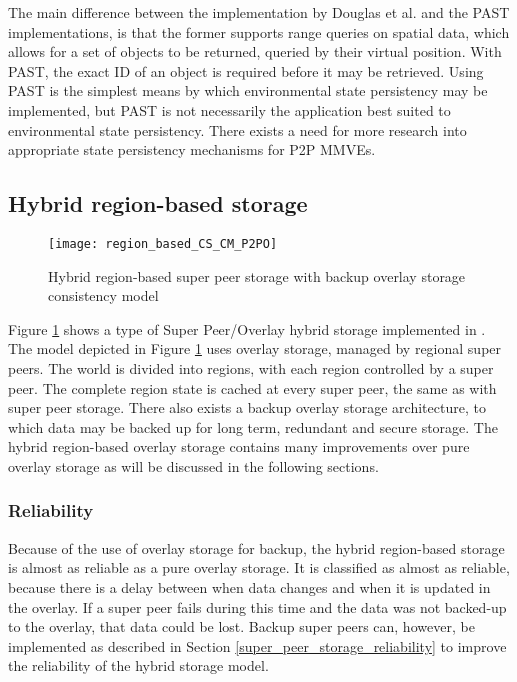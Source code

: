 The main difference between the implementation by Douglas et al. and the PAST implementations, is that the former supports range queries on spatial data, which allows for a set of objects to be returned, queried by their virtual position. With PAST, the exact ID of an object is required before it may be retrieved. Using PAST is the simplest means by which environmental state persistency may be implemented, but PAST is not necessarily the application best suited to environmental state persistency. There exists a need for more research into appropriate state persistency mechanisms for P2P MMVEs.

\subsection{Hybrid region-based storage}
\label{hybrid_storage}

\begin{figure}[htbp]
 \centering
 \texttt{[image: region\_based\_CS\_CM\_P2PO]}
 \caption{Hybrid region-based super peer storage with backup overlay storage consistency model}
 \label{fig_cs_region_o_cm}
\end{figure}
%
Figure \ref{fig_cs_region_o_cm} shows a type of Super Peer/Overlay hybrid storage implemented in  \cite{zoned_federation}. The model depicted in Figure \ref{fig_cs_region_o_cm} uses overlay storage, managed by regional super peers. The world is divided into regions, with each region controlled by a super peer. The complete region state is cached at every super peer, the same as with super peer storage. There also exists a backup
overlay storage architecture, to which data may be backed up for long term, redundant and secure storage. The hybrid region-based overlay storage contains many improvements over pure overlay storage as will be discussed in the following sections.

\subsubsection{Reliability}
\label{hybrid_storage_reliability}

Because of the use of overlay storage for backup, the hybrid region-based storage is almost as reliable as a pure overlay storage. It is classified as almost as reliable, because there is a delay between when data changes and when it is updated in the overlay. If a super peer fails during this time and the data was not backed-up to the overlay, that data could be lost. Backup super peers can, however, be implemented as described in Section
\ref{super_peer_storage_reliability} to improve the reliability of the hybrid storage model.

